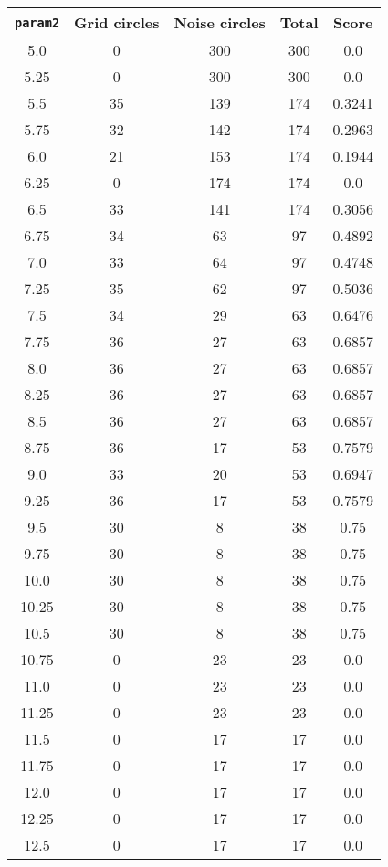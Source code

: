 \documentclass[letterpaper, 12pt]{article}
\begin{document}
\begin{longtable}{|c|c|c|c|c|}
\hline
\textbf{\texttt{param2}} & \textbf{Grid circles} & \textbf{Noise circles} & \textbf{Total} & \textbf{Score} \\
\hline
5.0 & 0 & 300 & 300 & 0.0 \\
\hline
5.25 & 0 & 300 & 300 & 0.0 \\
\hline
5.5 & 35 & 139 & 174 & 0.3241 \\
\hline
5.75 & 32 & 142 & 174 & 0.2963 \\
\hline
6.0 & 21 & 153 & 174 & 0.1944 \\
\hline
6.25 & 0 & 174 & 174 & 0.0 \\
\hline
6.5 & 33 & 141 & 174 & 0.3056 \\
\hline
6.75 & 34 & 63 & 97 & 0.4892 \\
\hline
7.0 & 33 & 64 & 97 & 0.4748 \\
\hline
7.25 & 35 & 62 & 97 & 0.5036 \\
\hline
7.5 & 34 & 29 & 63 & 0.6476 \\
\hline
7.75 & 36 & 27 & 63 & 0.6857 \\
\hline
8.0 & 36 & 27 & 63 & 0.6857 \\
\hline
8.25 & 36 & 27 & 63 & 0.6857 \\
\hline
8.5 & 36 & 27 & 63 & 0.6857 \\
\hline
8.75 & 36 & 17 & 53 & 0.7579 \\
\hline
9.0 & 33 & 20 & 53 & 0.6947 \\
\hline
9.25 & 36 & 17 & 53 & 0.7579 \\
\hline
9.5 & 30 & 8 & 38 & 0.75 \\
\hline
9.75 & 30 & 8 & 38 & 0.75 \\
\hline
10.0 & 30 & 8 & 38 & 0.75 \\
\hline
10.25 & 30 & 8 & 38 & 0.75 \\
\hline
10.5 & 30 & 8 & 38 & 0.75 \\
\hline
10.75 & 0 & 23 & 23 & 0.0 \\
\hline
11.0 & 0 & 23 & 23 & 0.0 \\
\hline
11.25 & 0 & 23 & 23 & 0.0 \\
\hline
11.5 & 0 & 17 & 17 & 0.0 \\
\hline
11.75 & 0 & 17 & 17 & 0.0 \\
\hline
12.0 & 0 & 17 & 17 & 0.0 \\
\hline
12.25 & 0 & 17 & 17 & 0.0 \\
\hline
12.5 & 0 & 17 & 17 & 0.0 \\

\end{longtable}
\end{document}
